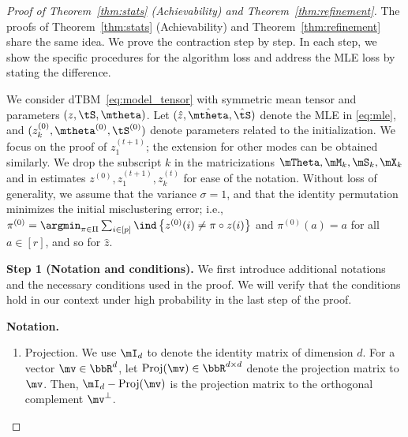 \documentclass[lettersize,onecolumn,journal]{IEEEtran}
\theoremstyle{definition}
\theoremstyle{definition}
\newcommand{\offf}[1]{\left\{#1\right\}}
\begin{document}
\begin{proof}[Proof of Theorem~\ref{thm:stats} (Achievability) and Theorem~\ref{thm:refinement}]

{
  

The proofs of Theorem~\ref{thm:stats} (Achievability) and Theorem~\ref{thm:refinement} share the same idea. We prove the contraction step by step. In each step, we show the specific procedures for the algorithm loss and address the MLE loss by stating the difference. 

We consider dTBM~\eqref{eq:model_tensor} with symmetric mean tensor and parameters $(z, \tS, \mtheta)$. Let $(\hat z, \hat \mtheta, \hat \tS)$ denote the MLE in \eqref{eq:mle}, and $(z^{(0)}_k, \mtheta^{(0)}, \tS^{(0)})$ denote parameters related to the initialization. We focus on the proof of $z^{(t+1)}_1$; the extension for other modes can be obtained similarly. We drop the subscript $k$ in the matricizations $\mTheta, \mM_k, \mS_k, \mX_k$ and in estimates $z^{(0)}, z^{(t+1)}_1, z^{(t)}_k$ for ease of the notation.  Without loss of generality, we assume that the variance $\sigma = 1$, and that the identity permutation minimizes the initial misclustering error; i.e., $\pi^{(0)} = \argmin_{\pi \in \Pi} \sum_{i \in [p]}\ind \offf{z^{(0)}(i) \neq \pi \circ z(i) }$ and $\pi^{(0)}(a) = a$ for all $ a \in [r]$, and so for $\hat z$. 
}



{\bf Step 1 (Notation and conditions).} We first introduce additional notations and the necessary conditions used in the proof. We will verify that the conditions hold in our context under high probability in the last step of the proof. 

{
  

\textbf{Notation.}
\begin{enumerate}[wide]

\item Projection. We use $\mI_d$ to denote the identity matrix of dimension $d$. For a vector $\mv \in \bbR^d$, let $\text{Proj}(\mv) \in \bbR^{d \times d}$ denote the projection matrix to $\mv$. Then, $\mI_d - \text{Proj}(\mv)$ is the projection matrix to the orthogonal complement $\mv^{\perp}$. 


\end{enumerate}}
\end{proof}
\end{document}
